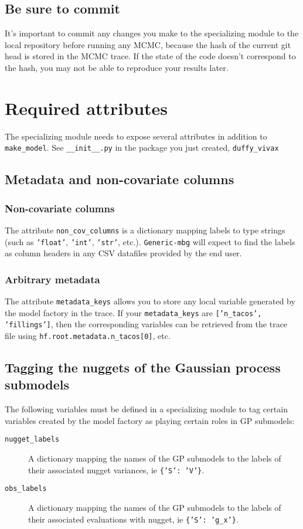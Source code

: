 \subsection{Be sure to commit}
\label{sub:git-commit} 
It's important to commit any changes you make to the specializing module to the local repository before running any MCMC, because the hash of the current git head is stored in the MCMC trace. If the state of the code doesn't correspond to the hash, you may not be able to reproduce your results later.

\section{Required attributes}

The specializing module needs to expose several attributes in addition to \texttt{make\_model}. See \texttt{\_\_init\_\_.py} in the package you just created, \texttt{duffy\_vivax}

\subsection{Metadata and non-covariate columns}
\subsubsection{Non-covariate columns} 
The attribute \texttt{non\_cov\_columns} is a dictionary mapping labels to type strings (such as \texttt{'float'}, \texttt{'int'}, \texttt{'str'}, etc.). \texttt{Generic-mbg} will expect to find the labels as column headers in any CSV datafiles provided by the end user. 
\subsubsection{Arbitrary metadata} 
The attribute \texttt{metadata\_keys} allows you to store any local variable generated by the model factory in the trace. If your \texttt{metadata\_keys} are \texttt{['n\_tacos', 'fillings']}, then the corresponding variables can be retrieved from the trace file using \texttt{hf.root.metadata.n\_tacos[0]}, etc.

\subsection{Tagging the nuggets of the Gaussian process submodels}
\label{sub:variable-tags} 
The following variables must be defined in a specializing module to tag certain variables created by the model factory as playing certain roles in GP submodels:
\begin{description}
    \item[\texttt{nugget\_labels}] A dictionary mapping the names of the GP submodels to the labels of their associated nugget variances, ie \texttt{\{'S': 'V'\}}.
    \item[\texttt{obs\_labels}] A dictionary mapping the names of the GP submodels to the labels of their associated evaluations with nugget, ie \texttt{\{'S': 'g\_x'\}}.
\end{description}


